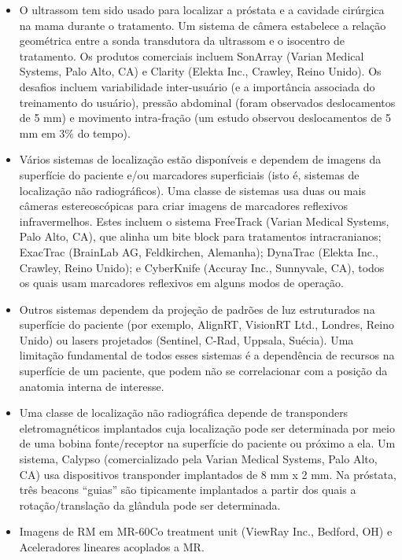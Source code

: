 \documentclass[11pt,a4paper]{article}
\newcounter{exemplo}
\begin{document}
    \begin{itemize}[label=\textcolor{CarnationPink}{$\blacktriangleright$}]
        \item  O ultrassom tem sido usado para localizar a próstata e a cavidade cirúrgica na mama durante o tratamento. Um sistema de câmera estabelece a relação geométrica entre a sonda transdutora da ultrassom e o isocentro de tratamento. Os produtos comerciais incluem SonArray (Varian Medical Systems, Palo Alto, CA) e Clarity (Elekta Inc., Crawley, Reino Unido). Os desafios incluem variabilidade inter-usuário (e a importância associada do treinamento do usuário), pressão abdominal (foram observados deslocamentos de 5 mm) e movimento intra-fração (um estudo observou deslocamentos de 5 mm em 3\% do tempo).

        \item Vários sistemas de localização estão disponíveis e dependem de imagens da superfície do paciente e/ou marcadores superficiais (isto é, sistemas de localização não radiográficos). Uma classe de sistemas usa duas ou mais câmeras estereoscópicas para criar imagens de marcadores reflexivos infravermelhos. Estes incluem o sistema FreeTrack (Varian Medical Systems, Palo Alto, CA), que alinha um bite block para tratamentos intracranianos; ExacTrac (BrainLab AG, Feldkirchen, Alemanha); DynaTrac (Elekta Inc., Crawley, Reino Unido); e CyberKnife (Accuray Inc., Sunnyvale, CA), todos os quais usam marcadores reflexivos em alguns modos de operação.
        
        \item Outros sistemas dependem da projeção de padrões de luz estruturados na superfície do paciente (por exemplo, AlignRT, VisionRT Ltd., Londres, Reino Unido) ou lasers projetados (Sentinel, C-Rad, Uppsala, Suécia). Uma limitação fundamental de todos esses sistemas é a dependência de recursos na superfície de um paciente, que podem não se correlacionar com a posição da anatomia interna de interesse.
        
        \item Uma classe de localização não radiográfica depende de transponders eletromagnéticos implantados cuja localização pode ser determinada por meio de uma bobina fonte/receptor na superfície do paciente ou próximo a ela. Um sistema, Calypso (comercializado pela Varian Medical Systems, Palo Alto, CA) usa dispositivos transponder implantados de 8 mm x 2 mm. Na próstata, três beacons ``guias'' são tipicamente implantados a partir dos quais a rotação/translação da glândula pode ser determinada.
        
        \item Imagens de RM em MR-60Co treatment unit (ViewRay Inc., Bedford, OH) e Aceleradores lineares acoplados a MR.
        
    \end{itemize}
\end{document}
